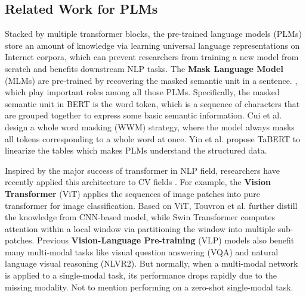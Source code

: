 \documentclass[letterpaper]{article} \usepackage{aaai23}  \usepackage{times}  \usepackage{helvet}  \usepackage{courier}  \usepackage[hyphens]{url}  \usepackage{graphicx} \urlstyle{rm} \def\UrlFont{\rm}  \usepackage{natbib}  \usepackage{caption} \frenchspacing  \setlength{\pdfpagewidth}{8.5in}  \setlength{\pdfpageheight}{11in}  \usepackage{algorithm}
\newcommand{\fy}[1]{{\color{black}#1}}
\begin{document}
\subsection{Related Work for PLMs}
Stacked by multiple transformer \cite{DBLP:conf/nips/VaswaniSPUJGKP17} blocks, the pre-trained language models (PLMs) store an amount of knowledge via learning universal language representations on Internet {corpora,}
which can prevent researchers from training a new model from scratch and benefits downstream NLP tasks.
The \textbf{Mask Language Model} (MLMs) \cite{DBLP:conf/naacl/DevlinCLT19,DBLP:journals/taslp/CuiCLQY21,DBLP:conf/acl/YinNYR20} are pre-trained \fy{by} recovering the masked semantic unit in a sentence.
, \fy{which} play important roles among all those PLMs.
Specifically, the masked semantic unit in BERT \cite{DBLP:conf/naacl/DevlinCLT19} is the word token, which is a sequence of characters that are grouped together to express some basic semantic information.
Cui et al. \cite{DBLP:journals/taslp/CuiCLQY21} design a whole word masking (WWM) strategy, where the model always masks all tokens corresponding to a whole word at once. 
Yin et al. \cite{DBLP:conf/acl/YinNYR20} propose TaBERT to linearize the tables which makes PLMs understand the structured data. 

Inspired by the major success of transformer in NLP field, researchers have recently applied this architecture to CV fields \cite{DBLP:conf/iccv/WangX0FSLL0021,DBLP:conf/iclr/DosovitskiyB0WZ21,DBLP:conf/icml/TouvronCDMSJ21,DBLP:journals/corr/abs-2111-06377,DBLP:journals/corr/abs-2106-08254,DBLP:conf/iccv/LiuL00W0LG21}.
For example, the \textbf{Vision Transformer} (ViT) \cite{DBLP:conf/iclr/DosovitskiyB0WZ21} applies the sequences of image patches into pure transformer for image classification.
Based on ViT, Touvron et al. \cite{DBLP:conf/icml/TouvronCDMSJ21} 
further distill the knowledge from CNN-based model, while
Swin Transformer \cite{DBLP:conf/iccv/LiuL00W0LG21} 
computes attention within a local window via partitioning the window into multiple sub-patches. 
Previous \textbf{Vision-Language Pre-training} (VLP) models \cite{DBLP:conf/emnlp/TanB19,DBLP:conf/nips/LuBPL19,DBLP:conf/cvpr/ZhangLHY0WCG21,DBLP:conf/eccv/Li0LZHZWH0WCG20} also benefit many multi-modal tasks like visual question answering (VQA) and natural language visual reasoning (NLVR2). 
But normally,
when \fy{a multi-modal network is applied to a single-modal task, its performance drops rapidly due to the missing modality. Not to mention performing on a zero-shot single-modal task.}
\end{document}
